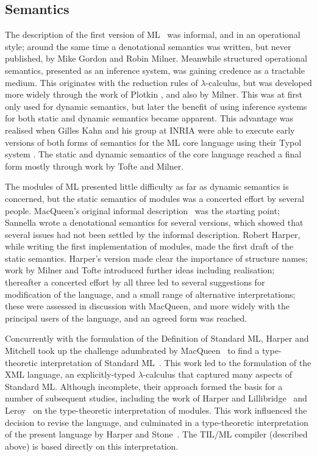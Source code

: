 \subsection*{Semantics}

The description of the first version of ML~\cite{GMW} was informal, and in an
operational style; around the same time a denotational semantics was written,
but never published, by Mike Gordon and Robin Milner.  Meanwhile structured
operational semantics, presented as an inference system, was gaining credence
as a tractable medium.  This originates with the reduction rules of
$\lambda$-calculus, but was developed more widely through the work of Plotkin
\cite{Plo}, and also by Milner.  This was at first only used for dynamic
semantics, but later the benefit of using inference systems for both static
and dynamic semantics became apparent.  This advantage was realised when
Gilles Kahn and his group at INRIA were able to execute early versions of both
forms of semantics for the ML core language using their Typol system
\cite{Des}.  The static and dynamic semantics of the core language reached a
final form mostly through work by Tofte and Milner.

The modules of ML presented little difficulty as far as dynamic semantics is
concerned, but the static semantics of modules was a concerted effort by
several people.  MacQueen's original informal description~\cite{HMM} was the
starting point; Sannella wrote a denotational semantics for several versions,
which showed that several issues had not been settled by the informal
description.  Robert Harper, while writing the first implementation of
modules, made the first draft of the static semantics.  Harper's version made
clear the importance of structure names; work by Milner and Tofte introduced
further ideas including realisation; thereafter a concerted effort by all
three led to several suggestions for modification of the language, and a small
range of alternative interpretations; these were assessed in discussion with
MacQueen, and more widely with the principal users of the language, and an
agreed form was reached.

Concurrently with the formulation of the Definition of Standard ML, Harper and
Mitchell took up the challenge adumbrated by MacQueen~\cite{Mac2} to find
a type-theoretic interpretation of Standard ML~\cite{HM}.  This work led to
the formulation of the XML language, an explicitly-typed $\lambda$-calculus
that captured many aspects of Standard ML.  Although incomplete, their
approach formed the basis for a number of subsequent studies, including the
work of Harper and Lillibridge~\cite{HL} and Leroy~\cite{leroy94} on the
type-theoretic interpretation of modules.  This work influenced the decision
to revise the language, and culminated in a type-theoretic interpretation of
the present language by Harper and Stone~\cite{SH}.  The TIL/ML compiler
(described above) is based directly on this interpretation.

